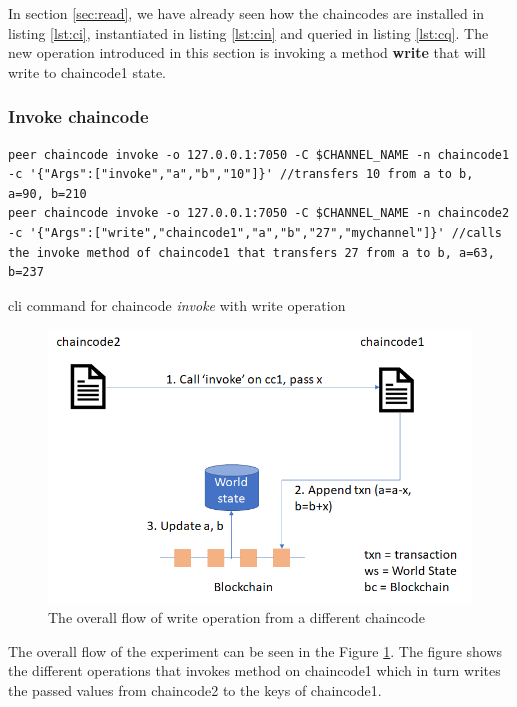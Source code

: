 \documentclass[
  a4paper,  %
  twoside,  %
  bibliography=totoc,
  headsepline,
  cleardoublepage=empty,
  parskip=half,
  draft=false
]{scrbook}
\begin{document}
In section \ref{sec:read}, we have already seen how the chaincodes are installed in listing \ref{lst:ci}, instantiated in listing \ref{lst:cin} and queried in listing \ref{lst:cq}. The new operation introduced in this section is invoking a method \textbf{write} that will write to chaincode1 state.

\subsubsection{Invoke chaincode}
\begin{Listing}[h!]
\begin{lstlisting}
peer chaincode invoke -o 127.0.0.1:7050 -C $CHANNEL_NAME -n chaincode1 -c '{"Args":["invoke","a","b","10"]}' //transfers 10 from a to b, a=90, b=210
peer chaincode invoke -o 127.0.0.1:7050 -C $CHANNEL_NAME -n chaincode2 -c '{"Args":["write","chaincode1","a","b","27","mychannel"]}' //calls the invoke method of chaincode1 that transfers 27 from a to b, a=63, b=237
\end{lstlisting}
\caption{cli command for chaincode \textit{invoke} with write operation}
\label{lst:winv}
\end{Listing}
\begin{figure}[h!]
\begin{center}
\includegraphics[width=\textwidth]{graphics/writesc.png}
\caption{The overall flow of write operation from a different chaincode}
\label{fig:writesc}
\end{center}
\end{figure}
The overall flow of the experiment can be seen in the Figure \ref{fig:writesc}. The figure shows the different operations that invokes method on chaincode1 which in turn writes the passed values from chaincode2 to the keys of chaincode1.
\end{document}
